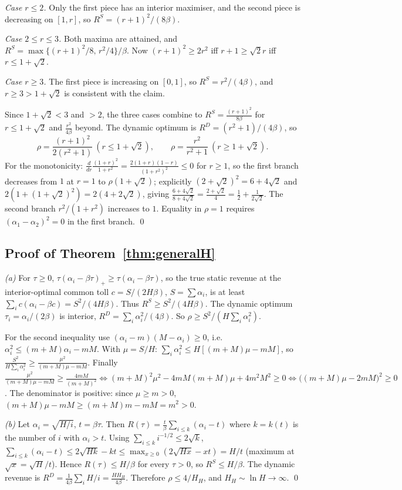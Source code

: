 \emph{Case $r\le2$.} Only the first piece has an interior maximiser, and the second piece is decreasing on $[1,r]$, so $R^S=(r+1)^2/(8\beta)$.

\emph{Case $2\le r\le3$.} Both maxima are attained, and $R^S=\max\{(r+1)^2/8,\,r^2/4\}/\beta$. Now $(r+1)^2\ge2r^2$ iff $r+1\ge\sqrt2r$ iff $r\le1+\sqrt2$.

\emph{Case $r\ge3$.} The first piece is increasing on $[0,1]$, so $R^S=r^2/(4\beta)$, and $r\ge3>1+\sqrt2$ is consistent with the claim.

Since $1+\sqrt2<3$ and $>2$, the three cases combine to $R^S=\frac{(r+1)^2}{8\beta}$ for $r\le1+\sqrt2$ and $\frac{r^2}{4\beta}$ beyond. The dynamic optimum is $R^D=(r^2+1)/(4\beta)$, so
\[\rho=\frac{(r+1)^2}{2(r^2+1)}\ (r\le1+\sqrt2),\qquad\rho=\frac{r^2}{r^2+1}\ (r\ge1+\sqrt2).\]
For the monotonicity: $\frac{d}{dr}\frac{(1+r)^2}{1+r^2}=\frac{2(1+r)(1-r)}{(1+r^2)^2}\le0$ for $r\ge1$, so the first branch decreases from $1$ at $r=1$ to $\rho(1+\sqrt2)$; explicitly $(2+\sqrt2)^2=6+4\sqrt2$ and $2(1+(1+\sqrt2)^2)=2(4+2\sqrt2)$, giving $\frac{6+4\sqrt2}{8+4\sqrt2}=\frac{2+\sqrt2}{4}=\frac12+\frac{1}{2\sqrt2}$. The second branch $r^2/(1+r^2)$ increases to $1$. Equality in $\rho=1$ requires $(\alpha_1-\alpha_2)^2=0$ in the first branch. \qed

\subsection{Proof of Theorem~\ref{thm:generalH}}
\emph{(a)} For $\tau\ge0$, $\tau(\alpha_i-\beta\tau)_+\ge\tau(\alpha_i-\beta\tau)$, so the true static revenue at the interior-optimal common toll $c=S/(2H\beta)$, $S=\sum\alpha_i$, is at least $\sum_ic(\alpha_i-\beta c)=S^2/(4H\beta)$. Thus $R^S\ge S^2/(4H\beta)$. The dynamic optimum $\tau_i=\alpha_i/(2\beta)$ is interior, $R^D=\sum_i\alpha_i^2/(4\beta)$. So $\rho\ge S^2/(H\sum_i\alpha_i^2)$.

For the second inequality use $(\alpha_i-m)(M-\alpha_i)\ge0$, i.e.\ $\alpha_i^2\le(m+M)\alpha_i-mM$. With $\mu=S/H$: $\sum_i\alpha_i^2\le H[(m+M)\mu-mM]$, so $\frac{S^2}{H\sum_i\alpha_i^2}\ge\frac{\mu^2}{(m+M)\mu-mM}$. Finally $\frac{\mu^2}{(m+M)\mu-mM}\ge\frac{4mM}{(m+M)^2}\iff(m+M)^2\mu^2-4mM(m+M)\mu+4m^2M^2\ge0\iff\big((m+M)\mu-2mM\big)^2\ge0$. The denominator is positive: since $\mu\ge m>0$, $(m+M)\mu-mM\ge(m+M)m-mM=m^2>0$.

\emph{(b)} Let $\alpha_i=\sqrt{H/i}$, $t=\beta\tau$. Then $R(\tau)=\frac t\beta\sum_{i\le k}(\alpha_i-t)$ where $k=k(t)$ is the number of $i$ with $\alpha_i>t$. Using $\sum_{i\le k}i^{-1/2}\le2\sqrt k$, $\sum_{i\le k}(\alpha_i-t)\le2\sqrt{Hk}-kt\le\max_{x\ge0}(2\sqrt{Hx}-xt)=H/t$ (maximum at $\sqrt x=\sqrt H/t$). Hence $R(\tau)\le H/\beta$ for every $\tau>0$, so $R^S\le H/\beta$. The dynamic revenue is $R^D=\frac1{4\beta}\sum_iH/i=\frac{HH_H}{4\beta}$. Therefore $\rho\le4/H_H$, and $H_H\sim\ln H\to\infty$. \qed

